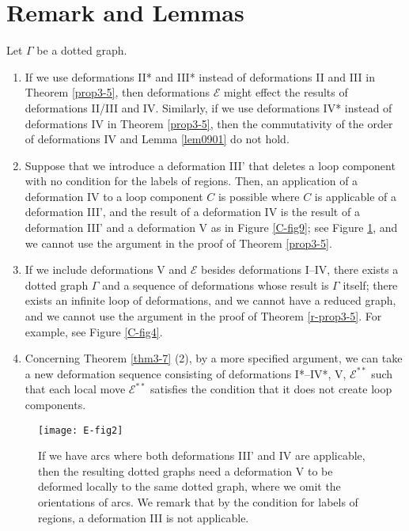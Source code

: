 \documentclass[a4paper,11pt]{amsart}
\numberwithin{equation}{section}
\begin{document}
 

\section{Remark and Lemmas}\label{sec-lemma}



\begin{remark}\label{rem902}
Let $\Gamma$ be a dotted graph. 
\begin{enumerate}[(1)]

\item
If we use deformations II* and III* instead of deformations II and III in Theorem \ref{prop3-5}, then deformations $\mathcal{E}$ might effect the results of deformations II/III and IV. 
Similarly, 
if we use deformations IV* instead of deformations IV in Theorem \ref{prop3-5}, then the commutativity of the order of deformations IV  and Lemma \ref{lem0901} do not hold. 

\item
Suppose that we introduce a deformation III' that deletes a loop component with no condition for the labels of regions. Then, an application of a deformation IV to a loop component $C$ is possible where $C$ is applicable of a deformation III', and the result of a deformation IV is the result of a deformation III' and a deformation V as in Figure \ref{C-fig9}; see Figure \ref{B-fig14}, and we cannot use the argument in the proof of Theorem \ref{prop3-5}. 

\item
If we include deformations V and $\mathcal{E}$ besides deformations I--IV, there exists a dotted graph $\Gamma$ and a sequence of deformations whose result is $\Gamma$ itself; there exists an infinite loop of deformations, and we cannot have a reduced graph, and we cannot use the argument in the proof of Theorem \ref{r-prop3-5}. For example, see Figure \ref{C-fig4}. 

\item
Concerning Theorem \ref{thm3-7} (2), 
by a more specified argument, we can take a new deformation sequence consisting of deformations I*--IV*, V, $\mathcal{E}^{**}$ such that each local move $\mathcal{E}^{**}$ satisfies the condition that it does not create loop components. 
\end{enumerate}
\end{remark}

 


\begin{figure}[ht]
\centering
\texttt{[image: E-fig2]}
\caption{If we have arcs where both deformations III' and IV are applicable, then the resulting dotted graphs need a deformation V to be deformed locally to the same dotted graph, where we omit the orientations of arcs. We remark that by the condition for labels of regions, a deformation III is not applicable. }%
\label{B-fig14}
\end{figure}
\end{document}
